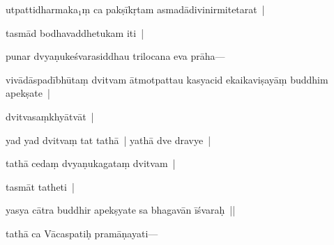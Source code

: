 \documentclass[article,12pt,a4paper]{memoir}%
\newcommand{\persName}[1]{#1}
\newcounter{parCount}
\begin{document}
	  \pstart \leavevmode%
	utpattidharmaka{\tiny $_{1}$}ṃ ca pakṣīkṛtam asmadādivinirmitetarat |
	{}
	\pend%
      

	  \pstart \leavevmode%
	tasmād bodhavaddhetukam iti |\label{sarit__ratnakīrtinibandhāvali__105213}
	{}
	\pend%
      

	  \pstart \leavevmode%
	\label{thakur75-40.1}punar dvyaṇukeśvarasiddhau \persName{trilocana} eva prāha—
	{}
	\pend%
      

	  \pstart \leavevmode%
	vivādāspadībhūtaṃ dvitvam ātmotpattau kasyacid ekaikaviṣayāṃ buddhim apekṣate |
	{}
	\pend%
      

	  \pstart \leavevmode%
	dvitvasaṃkhyātvāt |
	{}
	\pend%
      

	  \pstart \leavevmode%
	yad yad dvitvaṃ tat tathā | yathā dve dravye |
	{}
	\pend%
      

	  \pstart \leavevmode%
	tathā cedaṃ dvyaṇukagataṃ dvitvam |
	{}
	\pend%
      

	  \pstart \leavevmode%
	tasmāt tatheti |
	{}
	\pend%
      

	  \pstart \leavevmode%
	yasya cātra buddhir apekṣyate sa bhagavān īśvaraḥ ||
	{}
	\pend%
      

	  \pstart \leavevmode%
	tathā ca Vācaspatiḥ pramāṇayati—
	{}
	\pend%
      
\end{document}
